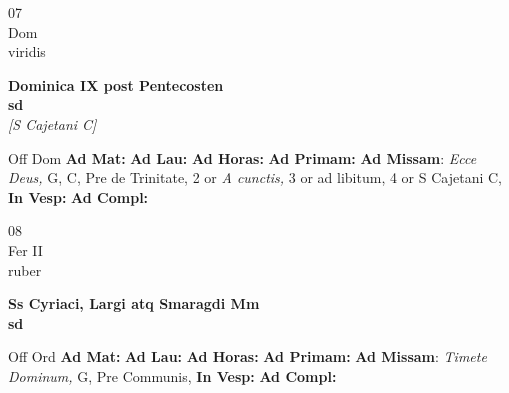 \documentclass[10pt, openany]{book}
\begin{document}
    \begin{center}
        \begin{minipage}{3.5in}
            \vspace{2em}
            \begin{minipage}{0.5in}
                {\Huge 07} \\
                {\normalsize Dom} \\
                {\normalsize viridis}
            \end{minipage}
            \begin{minipage}{3.0in}
                \textbf{ \large Dominica IX post Pentecosten \\
                \textnormal{\normalsize sd}} \\ \textit{[S Cajetani C]} \\ 
            \end{minipage}
            \begin{justify}Off Dom
                \textbf{Ad Mat: }
                \textbf{Ad Lau: }
                \textbf{Ad Horas: }
                \textbf{Ad Primam: }\textbf{Ad Missam}: \textit{Ecce Deus,} G, C, Pre de Trinitate, 2 or \textit{A cunctis,} 3 or ad libitum, 4 or S Cajetani C,  
                \textbf{In Vesp: }
                \textbf{Ad Compl: }
            \end{justify}
        \end{minipage}
    \end{center}

    \begin{center}
        \begin{minipage}{3.5in}
            \vspace{2em}
            \begin{minipage}{0.5in}
                {\Huge 08} \\
                {\normalsize Fer II} \\
                {\normalsize ruber}
            \end{minipage}
            \begin{minipage}{3.0in}
                \textbf{ \large Ss Cyriaci, Largi atq Smaragdi Mm \\
                \textnormal{\normalsize sd}} \\ 
            \end{minipage}
            \begin{justify}Off Ord
                \textbf{Ad Mat: }
                \textbf{Ad Lau: }
                \textbf{Ad Horas: }
                \textbf{Ad Primam: }\textbf{Ad Missam}: \textit{Timete Dominum,} G, Pre Communis,  
                \textbf{In Vesp: }
                \textbf{Ad Compl: }
            \end{justify}
        \end{minipage}
    \end{center}
\end{document}
